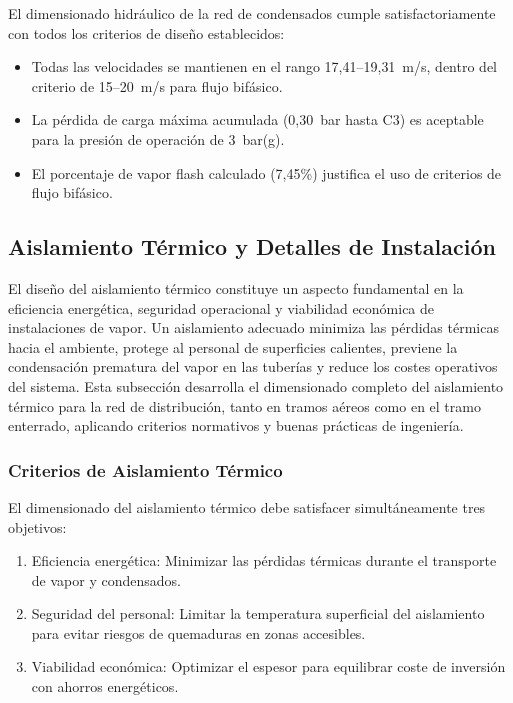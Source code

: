\documentclass[12pt]{article}
\begin{document}
El dimensionado hidráulico de la red de condensados cumple satisfactoriamente con todos los criterios de diseño establecidos:

\begin{itemize}[noitemsep]
	\item Todas las velocidades se mantienen en el rango 17{,}41--19{,}31~m/s, dentro del criterio de 15--20~m/s para flujo bifásico.
	\item La pérdida de carga máxima acumulada (0{,}30~bar hasta C3) es aceptable para la presión de operación de 3~bar(g).
	\item El porcentaje de vapor flash calculado (7{,}45\%) justifica el uso de criterios de flujo bifásico.
\end{itemize}


\subsection{Aislamiento Térmico y Detalles de Instalación}
\label{subsec:aislamiento_termico}

El diseño del aislamiento térmico constituye un aspecto fundamental en la eficiencia energética, seguridad operacional y viabilidad económica de instalaciones de vapor. Un aislamiento adecuado minimiza las pérdidas térmicas hacia el ambiente, protege al personal de superficies calientes, previene la condensación prematura del vapor en las tuberías y reduce los costes operativos del sistema. Esta subsección desarrolla el dimensionado completo del aislamiento térmico para la red de distribución, tanto en tramos aéreos como en el tramo enterrado, aplicando criterios normativos y buenas prácticas de ingeniería.


\subsubsection{Criterios de Aislamiento Térmico}
\label{subsubsec:criterios_aislamiento}

El dimensionado del aislamiento térmico debe satisfacer simultáneamente tres objetivos:

\begin{enumerate}[noitemsep]
	\item Eficiencia energética: Minimizar las pérdidas térmicas durante el transporte de vapor y condensados.
	\item Seguridad del personal: Limitar la temperatura superficial del aislamiento para evitar riesgos de quemaduras en zonas accesibles.
	\item Viabilidad económica: Optimizar el espesor para equilibrar coste de inversión con ahorros energéticos.
\end{enumerate}
\end{document}
